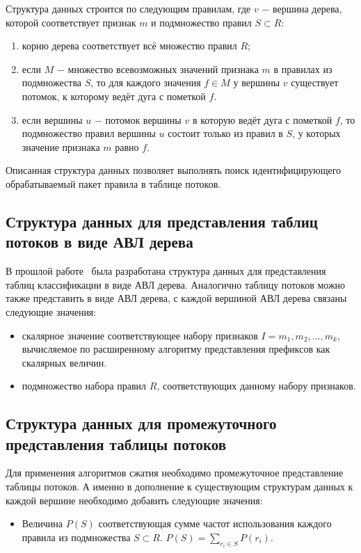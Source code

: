 \documentclass[a4paper, 12pt, titlepage, finall]{extreport}
\begin{document}
                Структура данных строится по следующим правилам, где \(v\) $-$ вершина дерева, которой соответствует признак \(m\) и подмножество правил \(S \subset R\):
                \begin{enumerate}
                    \item корню дерева соответствует всё множество правил \(R\);
                    \item если \(M\) $-$ множество всевозможных значений признака \(m\) в правилах из подмножества \(S\), то для каждого значения \(f \in M\)
                        у вершины \(v\) существует потомок, к которому ведёт дуга с пометкой \(f\).
                    \item если вершины \(u\) $-$ потомок вершины \(v\) в которую ведёт дуга с пометкой \(f\), то подмножество правил вершины \(u\) состоит только из
                        правил в \(S\), у которых значение признака \(m\) равно \(f\).
                \end{enumerate}

                Описанная структура данных позволяет выполнять поиск идентифицирующего обрабатываемый пакет правила в таблице потоков.
            \subsection{Структура данных для представления таблиц потоков в виде АВЛ дерева}
                В прошлой работе~\cite{nik_avl} была разработана структура данных для представления таблиц классификации в виде АВЛ дерева.
                Аналогично таблицу потоков можно также представить в виде АВЛ дерева, с каждой вершиной АВЛ дерева связаны следующие значения:
                \begin{itemize}
                    \item скалярное значение соответствующее набору признаков \(I = {m_1, m_2, \ldots, m_k}\), вычисляемое по расширенному алгоритму представления префиксов 
                        как скалярных величин.
                    \item подмножество набора правил \(R\), соответствующих данному набору признаков.
                \end{itemize}
            \subsection{Структура данных для промежуточного представления таблицы потоков}
                Для применения алгоритмов сжатия необходимо промежуточное представление таблицы потоков.
                А именно в дополнение к существующим структурам данных к каждой вершине необходимо добавить следующие значения:
                \begin{itemize}
                    \item Величина \(P(S)\) соответствующая сумме частот использования каждого правила из подмножества \(S \subset R\). 
                        \(P(S) = \sum_{r_i \in S} P(r_i)\).
                \end{itemize}
\end{document}
